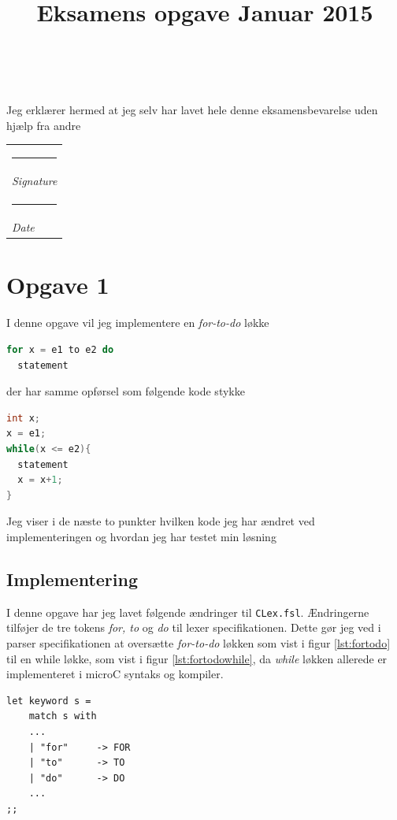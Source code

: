 \documentclass[danish,a4paper]{report}
\title{\Huge \textbf{\titlename} \\ \huge Eksamens opgave Januar 2015}
\author{\textsc{\name} \\ \textsc{\email}}
\makeatletter
\newcommand{\namesigdate}[2][10cm]{%
  \begin{tabular}{@{}p{#1}@{}}
    #2 \\[2\normalbaselineskip] \hrule \\[0pt]
    {\small \textit{Signature}} \\[2\normalbaselineskip] \hrule \\[0pt]
    {\small \textit{Date}}
  \end{tabular}
}
\makeatother
\begin{document}
\maketitle

\vspace*{\fill}
\begin{center}
\begin{large}
Jeg erklærer hermed at jeg selv har lavet hele denne eksamensbevarelse uden hjælp fra andre
\end{large}

\vspace*{2cm}
\namesigdate{}
\end{center}

\vspace*{\fill}


\newpage

\chapter*{Opgave 1}

I denne opgave vil jeg implementere en \textit{for-to-do} løkke

\begin{lstlisting}[language=C, label={lst:fortodo}]
for x = e1 to e2 do
  statement
\end{lstlisting}

der har samme opførsel som følgende kode stykke

\begin{lstlisting}[language=C, label={lst:fortodowhile}]
int x;
x = e1;
while(x <= e2){
  statement
  x = x+1;
}
\end{lstlisting}

Jeg viser i de næste to punkter hvilken kode jeg har ændret ved implementeringen og hvordan jeg har testet min løsning

\section*{Implementering}
I denne opgave har jeg lavet følgende ændringer til \texttt{CLex.fsl}. Ændringerne tilføjer de tre tokens \textit{for, to} og \textit{do} til lexer specifikationen. Dette gør jeg ved i parser specifikationen at oversætte \textit{for-to-do} løkken som vist i figur \ref{lst:fortodo} til en while løkke, som vist i figur \ref{lst:fortodowhile}, da \textit{while} løkken allerede er implementeret i microC syntaks og kompiler.

\begin{lstlisting}
let keyword s =
    match s with
    ...        
    | "for"     -> FOR 
    | "to"      -> TO 
    | "do"      -> DO 
    ...
;;
\end{lstlisting}
\end{document}

